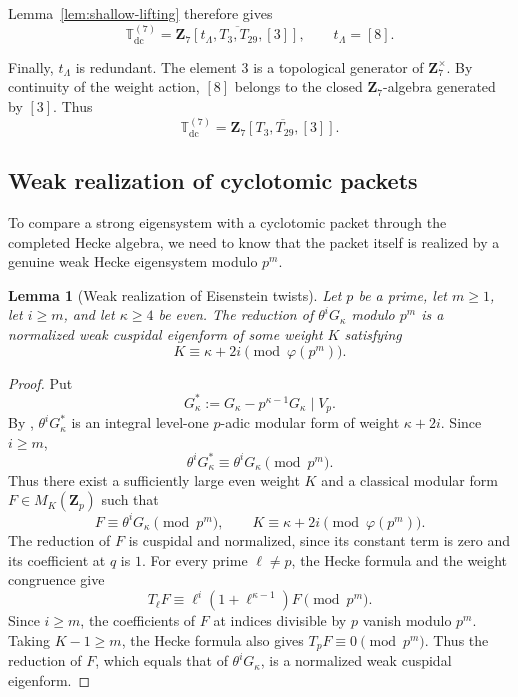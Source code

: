 \documentclass[11pt]{article}
\theoremstyle{plain}
\newtheorem{lemma}[theorem]{Lemma}
\theoremstyle{definition}
\theoremstyle{remark}
\numberwithin{equation}{section}
\begin{document}
Lemma~\ref{lem:shallow-lifting} therefore gives
\[
\mathbb T_{\mathrm{dc}}^{(7)}
=
\overline{\mathbf Z_7[t_\Lambda,T_3,T_{29},[3]]},
\qquad
t_\Lambda=[8].
\]

Finally, \(t_\Lambda\) is redundant. The element \(3\) is a topological generator of \(\mathbf Z_7^\times\). By continuity of the weight action, \([8]\) belongs to the closed
\(\mathbf Z_7\)-algebra generated by \([3]\). Thus \[\mathbb T_{\mathrm{dc}}^{(7)}=\overline{\mathbf Z_7[T_3,T_{29},[3]]}.\]


\subsection{Weak realization of cyclotomic packets}

To compare a strong eigensystem with a cyclotomic packet through the completed Hecke algebra, we need to know that the packet itself is realized by a genuine weak Hecke eigensystem modulo \(p^m\).

\begin{lemma}[Weak realization of Eisenstein twists] \label{lem:weak-cyclotomic} Let \(p\) be a prime, let \(m\geq1\), let \(i\geq m\), and let \(\kappa\geq4\) be even. The reduction of \(\theta^iG_\kappa\) modulo \(p^m\) is a normalized weak cuspidal eigenform of some weight \(K\) satisfying \[ K\equiv\kappa+2i\pmod{\varphi(p^m)}.
\]
\end{lemma}

\begin{proof} Put \[ G_\kappa^*:=G_\kappa-p^{\kappa-1}G_\kappa\mid V_p. \] By \cite[\S1.6 and Théorème~5]{Serre1973}, \(\theta^iG_\kappa^*\) is an integral level-one \(p\)-adic modular form of weight \(\kappa+2i\). Since \(i\geq m\), \[ \theta^iG_\kappa^* \equiv\theta^iG_\kappa\pmod{p^m}. \] Thus there exist a sufficiently large even weight \(K\)
and a classical modular form \(F\in M_K(\mathbf Z_p)\) such that \[ F\equiv\theta^iG_\kappa\pmod{p^m}, \qquad K\equiv\kappa+2i\pmod{\varphi(p^m)}. \] The reduction of \(F\) is cuspidal and normalized, since its constant term is zero and its coefficient at \(q\) is \(1\). For every prime \(\ell\ne p\), the Hecke formula and the weight congruence give \[ T_\ell F\equiv\ell^i(1+\ell^{\kappa-1})F\pmod{p^m}. \] Since \(i\geq m\), the coefficients of \(F\) at indices divisible by \(p\) vanish modulo \(p^m\). Taking \(K-1\geq m\), the Hecke formula also gives \(T_pF\equiv0\pmod{p^m}\). Thus the reduction of \(F\), which equals that of \(\theta^iG_\kappa\), is a normalized weak cuspidal eigenform.
\end{proof}
\end{document}

